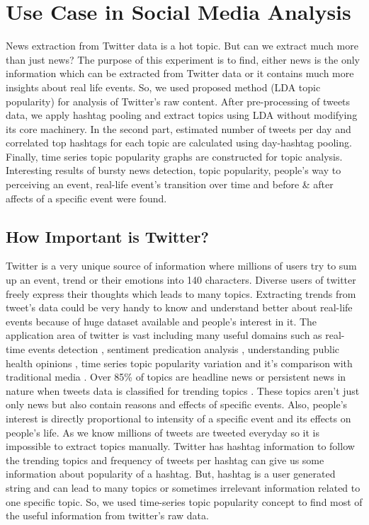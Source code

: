 \chapter{Use Case in Social Media Analysis}
News extraction from Twitter data is a hot topic. But can we extract much more than just news? The purpose of this experiment is to find, either news is the only information which can be extracted from Twitter data or it contains much more insights about real life events. So, we used proposed  method (LDA topic popularity) for analysis of Twitter’s raw content. After pre-processing of tweets data, we apply hashtag pooling and extract topics using LDA without modifying its core machinery. In the second part, estimated number of tweets per day and correlated top hashtags for each topic are calculated using day-hashtag pooling. Finally, time series topic popularity graphs are constructed for topic analysis. Interesting results of bursty news detection, topic popularity, people’s way to perceiving an event, real-life event’s transition over time and before & after affects of a specific event were found.

\section{How Important is Twitter?}
Twitter is a very unique source of information where millions of users try to sum up an event, trend or their emotions into 140 characters. Diverse users of twitter freely express their thoughts which leads to many topics. Extracting trends from tweet’s data could be very handy to know and understand better about real-life events because of huge dataset available and people’s interest in it. The application area of twitter is vast including many useful domains such as real-time events detection \cite{sakaki2010earthquake}, sentiment predication analysis \cite{tumasjan2010predicting}, understanding public health opinions \cite{karami2018characterizing}, time series topic popularity variation \cite{fukuyama2018extracting} and it's comparison with traditional media \cite{zhao2011comparing}. Over 85\% of topics are headline news or persistent news in nature when tweets data is classified for trending topics  \cite{kwak2010twitter}. These topics aren't just only news but also contain reasons and effects of specific events. Also, people's interest is directly proportional to intensity of a specific event and its effects on people's life. As we know millions of tweets are tweeted everyday so it is impossible to extract topics manually. Twitter has hashtag information to follow the trending topics and frequency of tweets per hashtag can give us some information about popularity of a hashtag. But, hashtag is a user generated string and can lead to many topics or sometimes irrelevant information related to one specific topic. So, we used time-series topic popularity concept to find most of the useful information from twitter's raw data.

